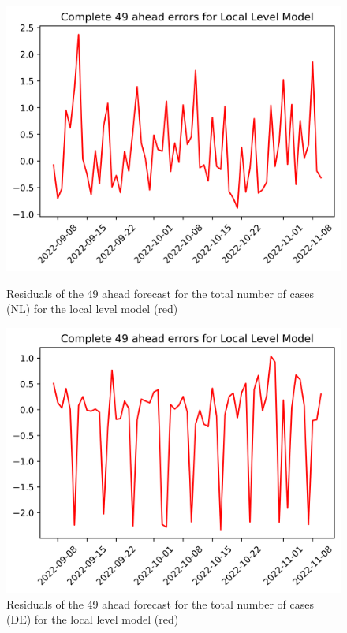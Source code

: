 \begin{figure}

\begin{minipage}{.45\textwidth}
  \centering
  \includegraphics[width=\linewidth]{pics/49_ah/49_ahead_errors_Local Level Model.png}
  \caption{Residuals of the 49 ahead forecast for the total number of cases (NL) for the local level model (red)}
  \label{fig:tot_cases_error_49_LLM}
\end{minipage}
\begin{minipage}{.45\textwidth}
  \centering
  \includegraphics[width=\linewidth]{pics/49_ah/DE_49_ahead_errors_Local Level Model.png}
  \caption{Residuals of the 49 ahead forecast for the total number of cases (DE) for the local level model (red)}
  \label{fig:tot_cases_error_49_LLM_DE}
\end{minipage}

\end{figure}
